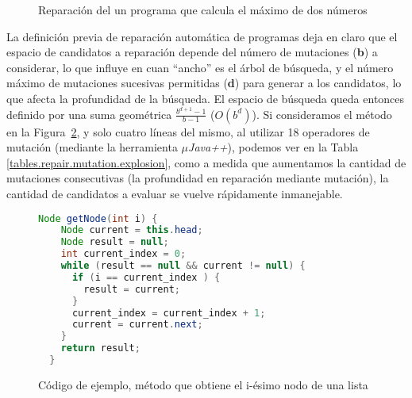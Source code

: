 \begin{figure}
	\centering
	\caption{Reparaci\'on del un programa que calcula el m\'aximo de dos n\'umeros}
	\label{figures.examples.repairWithMutation}
\end{figure}

La definici\'on previa de reparaci\'on autom\'atica de programas deja en claro que el espacio de candidatos a reparaci\'on depende del n\'umero de mutaciones (\textbf{b}) a considerar, lo que influye en cuan ``ancho'' es el \'arbol de b\'usqueda, y el n\'umero m\'aximo de mutaciones sucesivas permitidas (\textbf{d}) para generar a los candidatos, lo que afecta la profundidad de la b\'usqueda. El espacio de b\'usqueda queda entonces definido por una suma geom\'etrica $\frac{b^{d+1}-1}{b-1}$ ($O(b^d)$). Si consideramos el m\'etodo en la Figura~\ref{figures.examples.repair.getNode}, y solo cuatro l\'ineas del mismo, al utilizar 18 operadores de mutaci\'on (mediante la herramienta \emph{$\mu$Java++}), podemos ver en la Tabla \ref{tables.repair.mutation.explosion}, como a medida que aumentamos la cantidad de mutaciones consecutivas (la profundidad en reparaci\'on mediante mutaci\'on), la cantidad de candidatos a evaluar se vuelve r\'apidamente inmanejable.

\begin{figure}
	\begin{lstlisting}[frame=single, mathescape=true,language=Java,basicstyle={},framexleftmargin=.073\textwidth,xleftmargin=.085\textwidth,xrightmargin=0.012\textwidth]
  Node getNode(int i) {
    Node current = this.head;
    Node result = null;
    int current_index = 0;
    while (result == null && current != null) {
      if (i == current_index ) {
        result = current;
      }
      current_index = current_index + 1;
      current = current.next;
    }
    return result;
  }
	\end{lstlisting}
	\caption{C\'odigo de ejemplo, m\'etodo que obtiene el i-\'esimo nodo de una lista}
	\label{figures.examples.repair.getNode}
\end{figure}

